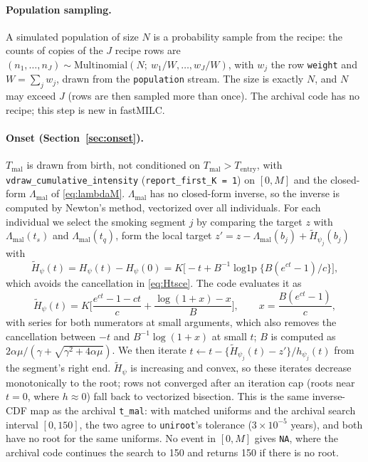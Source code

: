 \documentclass[11pt]{article}
\newcommand{\code}[1]{\texttt{#1}}
\newcommand{\Tentry}{T_{\mathrm{entry}}}
\newcommand{\Tmal}{T_{\mathrm{mal}}}
\begin{document}
\paragraph{Population sampling.} A simulated population of size $N$ is a
probability sample from the recipe: the counts of copies of the $J$ recipe
rows are $(n_1,\dots,n_J) \sim \mathrm{Multinomial}(N;\ w_1/W,\dots,w_J/W)$,
with $w_j$ the row \code{weight} and $W = \sum_j w_j$, drawn from the
\code{population} stream. The size is exactly $N$, and $N$ may exceed $J$
(rows are then sampled more than once). The archival code has no recipe; this
step is new in fastMILC.

\paragraph{Onset (Section~\ref{sec:onset}).} $\Tmal$ is drawn from birth, not
conditioned on $\Tmal>\Tentry$, with \code{vdraw\_cumulative\_intensity}
(\code{report\_first\_K = 1}) on $[0,M]$ and the closed-form $\Lambda_{\mathrm{mal}}$
of \eqref{eq:lambdaM}. $\Lambda_{\mathrm{mal}}$ has no closed-form inverse, so the
inverse is computed by Newton's method, vectorized over all individuals. For
each individual we select the smoking segment $j$ by comparing the target $z$
with $\Lambda_{\mathrm{mal}}(t_s)$ and $\Lambda_{\mathrm{mal}}(t_q)$, form the local
target $z' = z - \Lambda_{\mathrm{mal}}(b_j) + \tilde H_{\psi_j}(b_j)$ with
\[
\tilde H_\psi(t) = H_\psi(t)-H_\psi(0)
 = K\Big[-t + B^{-1}\operatorname{log1p}\big\{B(e^{ct}-1)/c\big\}\Big],
\]
which avoids the cancellation in \eqref{eq:Htsce}. The code evaluates it as
\[
\tilde H_\psi(t) = K\Big[\frac{e^{ct}-1-ct}{c} + \frac{\log(1+x)-x}{B}\Big],
\qquad x = \frac{B(e^{ct}-1)}{c},
\]
with series for both numerators at small arguments, which also removes the
cancellation between $-t$ and $B^{-1}\log(1+x)$ at small $t$; $B$ is computed as
$2\alpha\mu/(\gamma+\sqrt{\gamma^2+4\alpha\mu})$. We then iterate
$t \leftarrow t - \{\tilde H_{\psi_j}(t)-z'\}/h_{\psi_j}(t)$ from the segment's
right end. $\tilde H_\psi$ is increasing and convex, so these iterates decrease
monotonically to the root; rows not converged after an iteration cap (roots near
$t=0$, where $h\approx 0$) fall back to vectorized bisection. This is the same
inverse-CDF map as the archival \code{t\_mal}: with matched uniforms and the
archival search interval $[0,150]$, the two agree to \code{uniroot}'s tolerance
($3\times10^{-5}$ years), and both have no root for the same uniforms. No event in $[0,M]$ gives
\code{NA}, where the archival code continues the search to 150 and returns 150
if there is no root.
\end{document}
